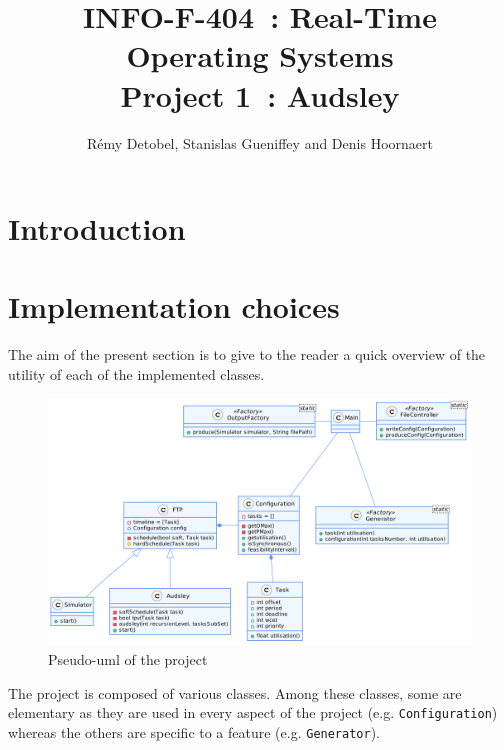 \documentclass[a4paper,11pt]{article}
\title{INFO-F-404~: Real-Time Operating Systems\\Project 1~: Audsley}
\author{Rémy Detobel, Stanislas Gueniffey and Denis Hoornaert}
\begin{document}
\maketitle

\section{Introduction}

\section{Implementation choices}
  The aim of the present section is to give to the reader a quick overview of the utility of each of the implemented classes.\\
  
  \begin{figure}[ht!]
    \centering
    \includegraphics[scale=0.175]{img/uml.png}
    \caption{Pseudo-uml of the project}
    \label{fig:pseudo-uml}
  \end{figure}
  \noindent The project is composed of various classes. Among these classes, some are elementary as they are used in every aspect of the project (e.g. \verb|Configuration|) whereas the others are specific to a feature (e.g. \verb|Generator|).\\
  
\end{document}
